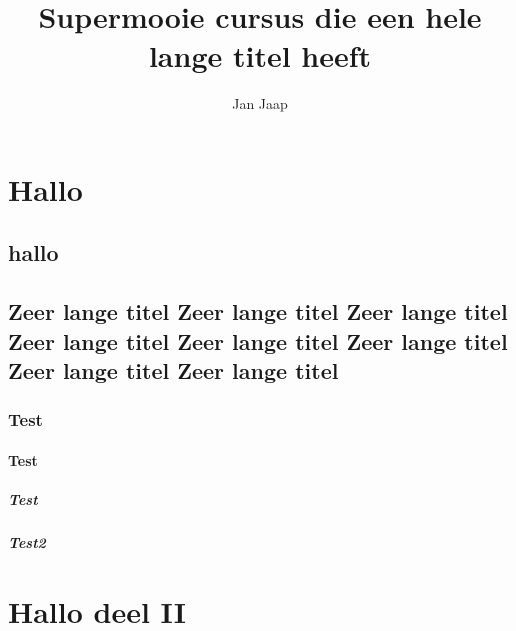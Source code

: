\documentclass[11pt,campus=default,faculty=we,layout=all,type=report,dutch]{ugent2016}
\author{Jan Jaap}
\title{Supermooie cursus die een hele lange titel heeft}
\begin{document}
    \maketitle
    \tableofcontents

    \part{Hallo}
    \chapter{hallo}
    \lipsum
    \chapter{Zeer lange titel Zeer lange titel Zeer lange titel Zeer lange titel Zeer lange titel Zeer lange titel Zeer lange titel Zeer lange titel}
    \section{Test}
    \lipsum[3]
    \subsection{Test}
    \lipsum
    \subsubsection{Test}
    \lipsum
    \subsubsection{Test2}
    \lipsum[2]
    \part{Hallo deel II}
    \lipsum[5]
\end{document}
